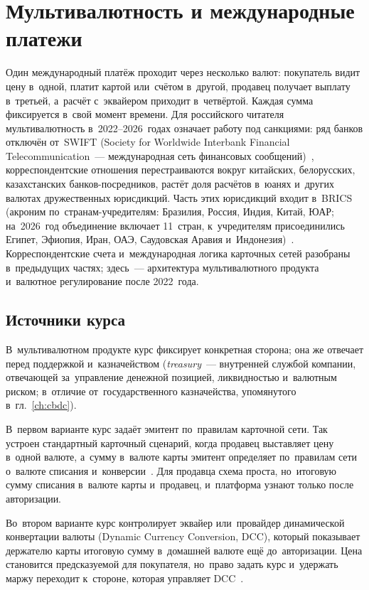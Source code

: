 
\chapter{Мультивалютность и международные платежи}\label{ch:multicurrency}
Один международный платёж проходит через несколько валют: покупатель видит цену
в~одной, платит картой или~счётом в~другой, продавец получает выплату
в~третьей, а~расчёт с~эквайером приходит в~четвёртой. Каждая сумма фиксируется
в~свой момент времени. Для российского читателя мультивалютность
в~2022--2026~годах означает работу под санкциями: ряд банков отключён от~SWIFT
(Society for Worldwide Interbank Financial Telecommunication~--- международная
сеть финансовых сообщений)~\cite{swift-overview}, корреспондентские отношения
перестраиваются вокруг китайских, белорусских, казахстанских
банков-посредников, растёт доля расчётов в~юанях и~других валютах дружественных
юрисдикций. Часть этих юрисдикций входит в~BRICS (акроним по~странам-учредителям:
  Бразилия, Россия, Индия, Китай, ЮАР; на~2026~год объединение включает
  11~стран, к~учредителям
  присоединились Египет, Эфиопия, Иран, ОАЭ, Саудовская Аравия
и~Индонезия)~\cite{brics-2026-chair}. Корреспондентские счета и~международная
логика карточных сетей разобраны в~предыдущих частях; здесь~--- архитектура
мультивалютного продукта и~валютное регулирование после 2022~года.

\section{Источники курса}\label{sec:mc-currencies}

В~мультивалютном продукте курс фиксирует конкретная сторона; она же отвечает
перед поддержкой и~казначейством (\textit{treasury}~--- внутренней службой
  компании, отвечающей за~управление денежной позицией, ликвидностью и~валютным
  риском; в~отличие от~государственного казначейства, упомянутого
в~гл.~\ref{ch:cbdc}).

В~первом варианте курс задаёт эмитент по~правилам карточной сети.
Так устроен стандартный карточный сценарий, когда продавец выставляет цену
в~одной валюте, а~сумму в~валюте карты эмитент определяет по~правилам сети
о~валюте списания и~конверсии~\cite{visa-core-rules,mc-dcc-guide}.
Для продавца схема проста, но~итоговую сумму списания в~валюте карты
и~продавец, и~платформа узнают только после авторизации.

Во~втором варианте курс контролирует эквайер или~провайдер динамической
конвертации валюты (Dynamic Currency Conversion, DCC), который показывает
держателю карты итоговую сумму в~домашней валюте ещё до~авторизации. Цена
становится предсказуемой для покупателя, но~право задать курс и~удержать маржу
переходит к~стороне, которая управляет DCC~\cite{visa-core-rules,mc-dcc-guide}.

